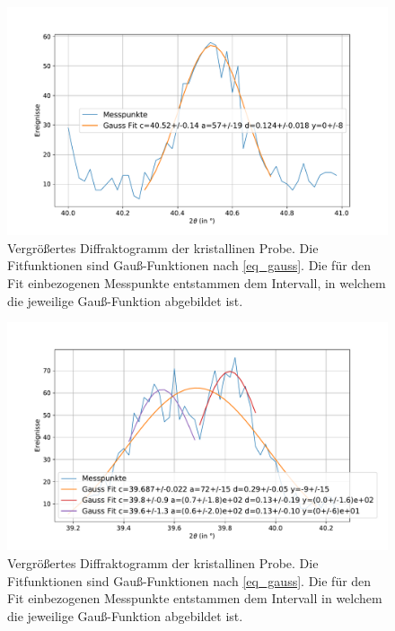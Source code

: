 \documentclass[
	a4paper,
	12pt,
	pagesize,
	ngerman
]{scrartcl}
\begin{document}
	\begin{figure}[H]
			\includegraphics[width=\linewidth]{img/XRD_Kristallin_40,5_0,5.pdf}
			\caption{
				Vergrößertes Diffraktogramm der kristallinen Probe.
				Die Fitfunktionen sind Gauß-Funktionen nach \cref{eq_gauss}.
				Die für den Fit einbezogenen Messpunkte entstammen dem Intervall, in welchem die jeweilige Gauß-Funktion abgebildet ist.
				}
			\label{fig_xrd_kristall_3}
	\end{figure}
	\begin{figure}[H]
			\includegraphics[width=\linewidth]{img/XRD_Kristallin_39,76_0,5.pdf}
			\caption{
				Vergrößertes Diffraktogramm der kristallinen Probe.
				Die Fitfunktionen sind Gauß-Funktionen nach \cref{eq_gauss}.
				Die für den Fit einbezogenen Messpunkte entstammen dem Intervall in welchem die jeweilige Gauß-Funktion abgebildet ist.
				}
			\label{fig_xrd_kristall_4}
	\end{figure}
\end{document}
